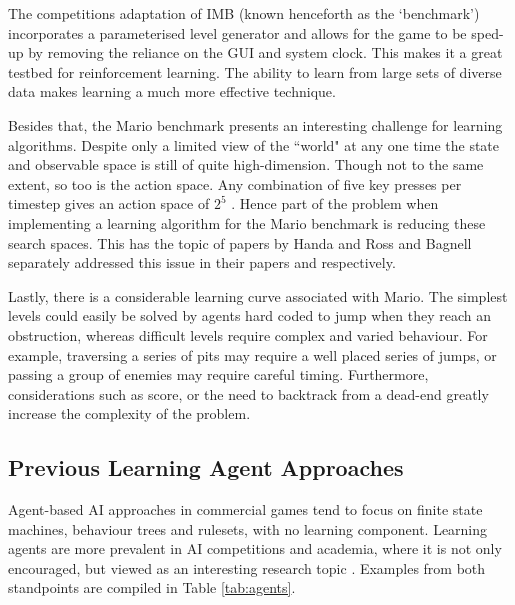 The competitions adaptation of IMB (known henceforth as the `benchmark') incorporates a parameterised level generator and allows for the game to be sped-up by removing the reliance on the GUI and system clock. This makes it a great testbed for reinforcement learning. The ability to learn from large sets of diverse data makes learning a much more effective technique. \cite[p.~3]{2012the}

Besides that, the Mario benchmark presents an interesting challenge for learning algorithms. Despite only a limited view of the ``world" at any one time the state and observable space is still of quite high-dimension. Though not to the same extent, so too is the action space. Any combination of five key presses per timestep gives an action space of $2^5$ \cite[p.~3]{2012the}. Hence part of the problem when implementing a learning algorithm for the Mario benchmark is reducing these search spaces. This has the topic of papers by Handa and Ross and Bagnell \cite{rossbagnell} separately addressed this issue in their papers \cite{handa} and \cite{rossbagnell} respectively.

Lastly, there is a considerable learning curve associated with Mario. The simplest levels could easily be solved by agents hard coded to jump when they reach an obstruction, whereas difficult levels require complex and varied behaviour. For example, traversing a series of pits may require a well placed series of jumps, or passing a group of enemies may require careful timing. Furthermore, considerations such as score, or the need to backtrack from a dead-end greatly increase the complexity of the problem. \cite[p.~3, p.~12]{2012the}



\subsection{Previous Learning Agent Approaches}
\label{ssec:prevagents}

Agent-based AI approaches in commercial games tend to focus on finite state machines, behaviour trees and rulesets, with no learning component. Learning agents are more prevalent in AI competitions and academia, where it is not only encouraged, but viewed as an interesting research topic \cite[p.~1]{marioaicomp}. Examples from both standpoints are compiled in Table \ref{tab:agents}.

